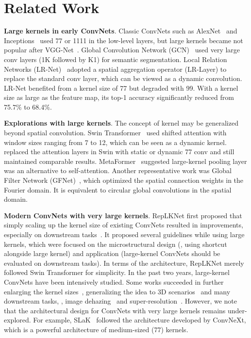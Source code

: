 \documentclass[10pt,twocolumn,letterpaper]{article}
\begin{document}
 \section{Related Work}

\noindent\textbf{Large kernels in early ConvNets}. Classic ConvNets such as AlexNet~\cite{krizhevsky2012imagenet} and Inceptions~\cite{szegedy2015going,szegedy2016rethinking,szegedy2017inception} used 77 or 1111 in the low-level layers, but large kernels became not popular after VGG-Net~\cite{simonyan2014very}. Global Convolution Network (GCN)~\cite{peng2017large} used very large conv layers (1K followed by K1) for semantic segmentation. Local Relation Networks (LR-Net)~\cite{hu2019local} adopted a spatial aggregation operator (LR-Layer) to replace the standard conv layer, which can be viewed as a dynamic convolution. LR-Net benefited from a kernel size of 77 but degraded with 99. With a kernel size as large as the feature map, its top-1 accuracy significantly reduced from 75.7\% to 68.4\%. 

\noindent\textbf{Explorations with large kernels}. The concept of kernel may be generalized beyond spatial convolution. Swin Transformer~\cite{swin} used shifted attention with window sizes ranging from 7 to 12, which can be seen as a dynamic kernel. \citet{han2021demystifying} replaced the attention layers in Swin with static or dynamic 77 conv and still maintained comparable results. MetaFormer~\cite{yu2021metaformer} suggested large-kernel pooling layer was an alternative to self-attention. Another representative work was Global Filter Network (GFNet)~\cite{rao2021global}, which optimized the spatial connection weights in the Fourier domain. It is equivalent to circular global convolutions in the spatial domain. 

\noindent\textbf{Modern ConvNets with very large kernels}. RepLKNet first proposed that simply scaling up the kernel size of existing ConvNets resulted in improvements, especially on downstream tasks~\cite{ding2022scaling}. It proposed several guidelines while using large kernels, which were focused on the microstructural design (\eg, using shortcut alongside large kernel) and application (large-kernel ConvNets should be evaluated on downstream tasks). In terms of the architecture, RepLKNet merely followed Swin Transformer for simplicity. In the past two years, large-kernel ConvNets have been intensively studied. Some works succeeded in further enlarging the kernel sizes~\cite{liu2022more}, generalizing the idea to 3D scenarios~\cite{chen2023largekernel3d} and many downstream tasks, \eg, image dehazing~\cite{luo2023lkd} and super-resolution~\cite{xie2023large}. However, we note that the architectural design for ConvNets with very large kernels remains under-explored. For example, SLaK~\cite{liu2022more} followed the architecture developed by ConvNeXt, which is a powerful architecture of medium-sized (77) kernels. 
\end{document}
